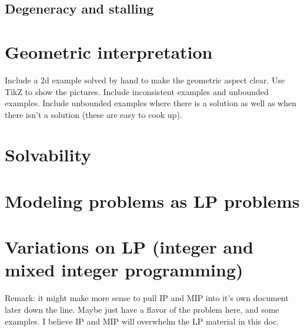 \documentclass[12pt,english]{article}
\begin{document}
\subsection{Degeneracy and stalling}

\section{Geometric interpretation}

Include a 2d example solved by hand to make the geometric aspect clear.  Use TikZ to show the pictures.   Include inconsistent examples and unbounded examples.  Include unbounded examples where there is a solution as well as when there isn't a solution (these are easy to cook up).

\section{Solvability}

\section{Modeling problems as LP problems}

\section{Variations on LP (integer and mixed integer programming)}

Remark: it might make more sense to pull IP and MIP into it's own document later down the line.  Maybe just have a flavor of the problem here, and some examples.  I believe IP and MIP will overwhelm the LP material in this doc.

{}

\end{document}
